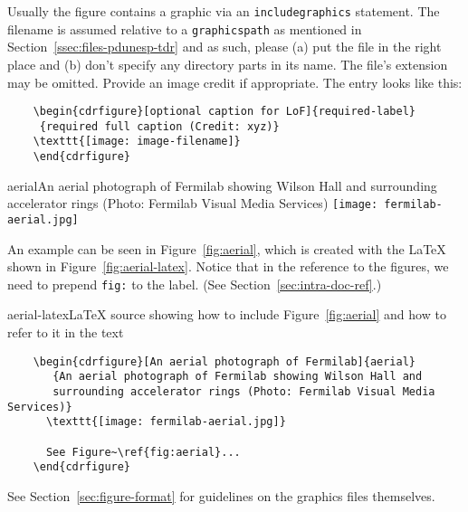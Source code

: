 Usually the figure contains a graphic via an \texttt{includegraphics} statement.
The filename is assumed relative to a \texttt{graphicspath} as
mentioned in Section~\ref{ssec:files-pdunesp-tdr} and as such, please (a) put the file in the right place and (b) don't
 specify any directory parts in its name.
The file's extension may be omitted. Provide an image credit if appropriate. The entry looks like this:

\begin{verbatim}
    \begin{cdrfigure}[optional caption for LoF]{required-label}
     {required full caption (Credit: xyz)}
    \texttt{[image: image-filename]}
    \end{cdrfigure}
\end{verbatim}



\begin{cdrfigure}{aerial}{An aerial photograph of Fermilab
    showing Wilson Hall and surrounding accelerator rings (Photo: Fermilab
    Visual Media Services)}
  \texttt{[image: fermilab-aerial.jpg]}
\end{cdrfigure}


An example can be seen in Figure~\ref{fig:aerial}, which is created
with the \LaTeX{} shown in Figure~\ref{fig:aerial-latex}.  Notice that in the reference to the figures, we need to prepend \texttt{fig:} to the label. (See Section~\ref{sec:intra-doc-ref}.)

\begin{cdrfigure}[]{aerial-latex}{\LaTeX{} source showing how to include Figure~\ref{fig:aerial} and how to refer to it in the text}
\begin{verbatim}
    \begin{cdrfigure}[An aerial photograph of Fermilab]{aerial}
       {An aerial photograph of Fermilab showing Wilson Hall and 
       surrounding accelerator rings (Photo: Fermilab Visual Media Services)}
      \texttt{[image: fermilab-aerial.jpg]}
      
      See Figure~\ref{fig:aerial}...
    \end{cdrfigure}
\end{verbatim}
\end{cdrfigure}

See Section~\ref{sec:figure-format} for guidelines on the graphics files themselves.

\FloatBarrier

